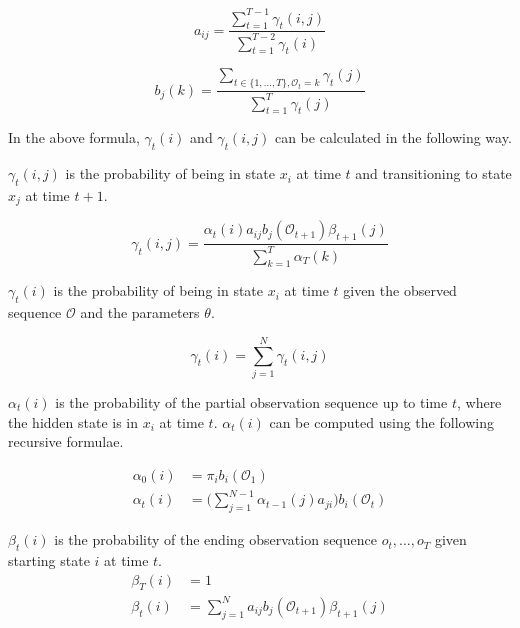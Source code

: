 \begin{equation*}
a_{ij} = \frac{\sum\limits_{t=1}^{T-1} \gamma_t(i, j)}{ \sum\limits_{t=1}^{T-2} \gamma_t(i) }
\end{equation*}

\begin{equation*}
b_j(k) = \frac{ \sum\limits_{t \in \{1,\ldots, T\}, \mathcal{O}_t = k} \gamma_t(j) } { \sum\limits_{t=1}^{T} \gamma_t(j) }
\end{equation*}

In the above formula, $\gamma_t(i)$ and $\gamma_t(i, j)$ can be calculated in the following way.

$\gamma_t(i, j)$ is the probability of being in state $x_i$ at time $t$ and transitioning to state $x_j$ at time $t+1$.

\begin{equation*}
\gamma_t(i,j) = \frac { \alpha_t(i) a_{ij} b_j(\mathcal{O}_{t+1}) \beta_{t+1}(j) } { \sum\limits_{k=1}^{T} \alpha_{T}(k) }
\end{equation*}

$\gamma_t(i)$ is the probability of being in state $x_i$ at time $t$ given the observed sequence $\mathcal{O}$ and the parameters $\theta$.

\begin{equation*}
\gamma_t(i) = \sum\limits_{j=1}^{N} \gamma_t(i,j)
\end{equation*}

$\alpha_t(i)$ is the probability of the partial observation sequence up to time $t$, where the hidden state is in $x_i$ at time $t$. $\alpha_t(i)$ can be computed using the following recursive formulae.

\begin{align*}
\alpha_0(i) &= \pi_i b_i(\mathcal{O}_1) \\
\alpha_t(i) &= \Bigg( \sum\limits_{j=1}^{N-1} \alpha_{t-1}(j) a_{ji} \Bigg) b_i(\mathcal{O}_t)
\end{align*}

$\beta_t(i)$ is the probability of the ending observation sequence $o_t,\ldots,o_{T}$ given starting state $i$ at time $t$.
\begin{align*}
\beta_{T}(i) &= 1 \\
\beta_t(i) &= \sum\limits_{j=1}^{N} a_{ij} b_j(\mathcal{O}_{t+1}) \beta_{t+1}(j)
\end{align*}

